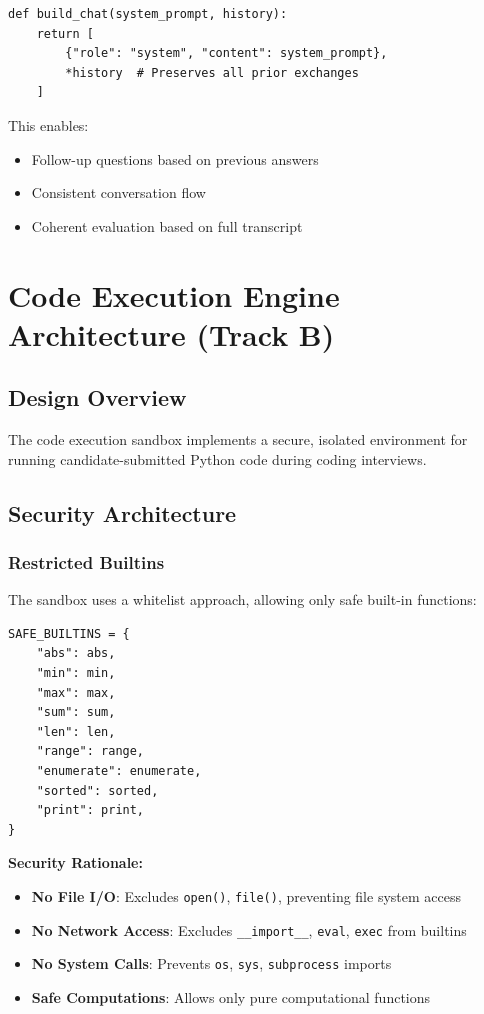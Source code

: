 \documentclass[12pt,a4paper]{article}
\begin{document}
\begin{lstlisting}[caption=Context Building with Memory]
def build_chat(system_prompt, history):
    return [
        {"role": "system", "content": system_prompt},
        *history  # Preserves all prior exchanges
    ]
\end{lstlisting}

This enables:
\begin{itemize}
    \item Follow-up questions based on previous answers
    \item Consistent conversation flow
    \item Coherent evaluation based on full transcript
\end{itemize}

\section{Code Execution Engine Architecture (Track B)}

\subsection{Design Overview}

The code execution sandbox implements a secure, isolated environment for running candidate-submitted Python code during coding interviews.

\subsection{Security Architecture}

\subsubsection{Restricted Builtins}
The sandbox uses a whitelist approach, allowing only safe built-in functions:

\begin{lstlisting}[caption=Safe Builtins Whitelist]
SAFE_BUILTINS = {
    "abs": abs,
    "min": min,
    "max": max,
    "sum": sum,
    "len": len,
    "range": range,
    "enumerate": enumerate,
    "sorted": sorted,
    "print": print,
}
\end{lstlisting}

\textbf{Security Rationale:}
\begin{itemize}
    \item \textbf{No File I/O}: Excludes \texttt{open()}, \texttt{file()}, preventing file system access
    \item \textbf{No Network Access}: Excludes \texttt{\_\_import\_\_}, \texttt{eval}, \texttt{exec} from builtins
    \item \textbf{No System Calls}: Prevents \texttt{os}, \texttt{sys}, \texttt{subprocess} imports
    \item \textbf{Safe Computations}: Allows only pure computational functions
\end{itemize}
\end{document}
